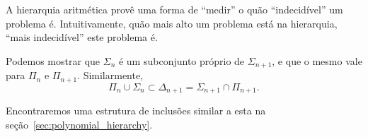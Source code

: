 A hierarquia aritmética provê uma forma de ``medir''
o quão ``indecidível'' um problema é.
Intuitivamente, quão mais alto um problema está na hierarquia,
``mais indecidível'' este problema é.

Podemos mostrar que $\Sigma_n$ é um subconjunto próprio de $\Sigma_{n+1}$,
e que o mesmo vale para $\Pi_n$ e $\Pi_{n+1}$.
Similarmente,
\begin{equation*}
    \Pi_n \cup \Sigma_n \subset \Delta_{n+1} = \Sigma_{n+1} \cap \Pi_{n+1}.
\end{equation*}

Encontraremos uma estrutura de inclusões similar a esta
na seção~\ref{sec:polynomial_hierarchy}.
